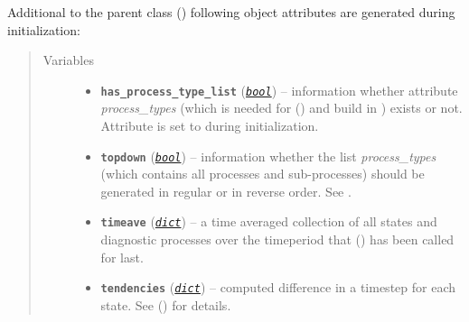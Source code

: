 \documentclass[a4paper,10pt,english]{sphinxmanual}
\begin{document}
\begin{fulllineitems}
Additional to the parent class {\hyperref[api/climlab.process:climlab.process.process.Process]{\emph{}}} ()
following object attributes are generated during initialization:
\begin{quote}\begin{description}
\item[{Variables}] \leavevmode\begin{itemize}
\item {} 
\textbf{\texttt{has\_process\_type\_list}} (\href{http://docs.python.org/2.7/library/functions.html\#bool}{\emph{\texttt{bool}}}) -- information whether attribute \emph{process\_types} 
(which is needed for {\hyperref[api/climlab.process:climlab.process.time_dependent_process.TimeDependentProcess.compute]{\emph{}}} () and build in
)
exists or not. Attribute is set to  
during initialization.

\item {} 
\textbf{\texttt{topdown}} (\href{http://docs.python.org/2.7/library/functions.html\#bool}{\emph{\texttt{bool}}}) -- information whether the list \emph{process\_types} (which 
contains all processes and sub-processes) should be 
generated in regular or in reverse order.
See .

\item {} 
\textbf{\texttt{timeave}} (\href{http://docs.python.org/2.7/library/stdtypes.html\#dict}{\emph{\texttt{dict}}}) -- a time averaged collection of all states and diagnostic 
processes over the timeperiod that 
{\hyperref[api/climlab.process:climlab.process.time_dependent_process.TimeDependentProcess.integrate_years]{\emph{}}} () has been called for last.

\item {} 
\textbf{\texttt{tendencies}} (\href{http://docs.python.org/2.7/library/stdtypes.html\#dict}{\emph{\texttt{dict}}}) -- computed difference in a timestep for each state. 
See {\hyperref[api/climlab.process:climlab.process.time_dependent_process.TimeDependentProcess.compute]{\emph{}}} () for details.


\end{itemize}
\end{description}
\end{quote}
\end{fulllineitems}
\end{document}
